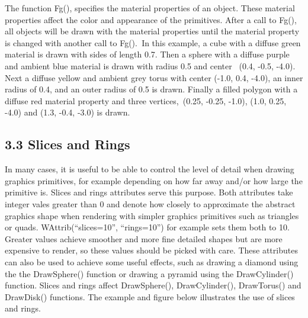 \documentclass[letterpaper]{article}
\begin{document}
{
The function \textsf{Fg()}, specifies the material properties of an object. These material properties affect the color
and appearance of the primitives. After a call to \textsf{Fg()}, all objects will be drawn with the material
properties until the material property is changed with another call to \textsf{Fg()}.\texttt{ }In this example, a cube
with a diffuse green material is drawn with sides of length 0.7. Then a sphere with a diffuse purple and ambient blue
material is drawn with radius 0.5 and center \ \textsf{(0.4, -0.5, -4.0)}. Next a diffuse yellow and ambient grey
torus with center \textsf{(-1.0, 0.4, -4.0)}, an inner radius of 0.4, and an outer radius of 0.5 is drawn. Finally a
filled polygon with a diffuse red material property and three vertices,\texttt{ }\textsf{(0.25, -0.25, -1.0)},
\textsf{(1.0, 0.25, -4.0)} and \textsf{(1.3, -0.4, -3.0)} is drawn.}

\subsection[3.3 Slices and Rings]{3.3 Slices and Rings}

{
In many cases, it is useful to be able to control the level of detail when drawing graphics primitives, for example
depending on how far away and/or how large the primitive is. Slices and rings attributes serve this purpose. Both
attributes take integer vales greater than 0 and denote how closely to approximate the abstract graphics shape when
rendering with simpler graphics primitives such as triangles or quads. \textsf{WAttrib(``slices=10'', ``rings=10'')}
for example sets them both to 10. Greater values achieve smoother and more fine detailed shapes but are more expensive
to render, so these values should be picked with care. These attributes can also be used to achieve some useful
effects, such as drawing a diamond using the the Draw\foreignlanguage{english}{Sphere()} function or drawing a pyramid
using the \textsf{Draw}\foreignlanguage{english}{\textsf{Cylinder()}} function.
\foreignlanguage{english}{\textsf{Slices}} and \foreignlanguage{english}{\textsf{rings}} affect
\textsf{Draw}\foreignlanguage{english}{\textsf{Sphere()}}, \textsf{Draw}\foreignlanguage{english}{\textsf{Cylinder()}},
\textsf{Draw}\foreignlanguage{english}{\textsf{Torus()}} and \textsf{Draw}\foreignlanguage{english}{\textsf{Disk()}}
functions. The example and figure below illustrates the use of \foreignlanguage{english}{\textsf{slices}} and
\foreignlanguage{english}{\textsf{rings}}.}
\end{document}
